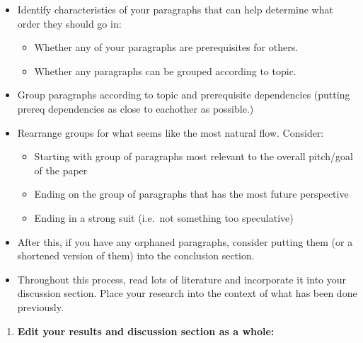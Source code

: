\documentclass[
]{krantz}
\providecommand{\tightlist}{%
  \setlength{\itemsep}{0pt}\setlength{\parskip}{0pt}}
\begin{document}
\begin{itemize}
\item
  Identify characteristics of your paragraphs that can help determine what order they should go in:

  \begin{itemize}
  \tightlist
  \item
    Whether any of your paragraphs are prerequisites for others.
  \item
    Whether any paragraphs can be grouped according to topic.
  \end{itemize}
\item
  Group paragraphs according to topic and prerequisite dependencies (putting prereq dependencies as close to eachother as possible.)
\item
  Rearrange groups for what seems like the most natural flow. Consider:

  \begin{itemize}
  \tightlist
  \item
    Starting with group of paragraphs most relevant to the overall pitch/goal of the paper
  \item
    Ending on the group of paragraphs that has the most future perspective
  \item
    Ending in a strong suit (i.e.~not something too speculative)
  \end{itemize}
\item
  After this, if you have any orphaned paragraphs, consider putting them (or a shortened version of them) into the conclusion section.
\item
  Throughout this process, read lots of literature and incorporate it into your discussion section. Place your research into the context of what has been done previously.
\end{itemize}

\begin{enumerate}
\def\labelenumi{\arabic{enumi}.}
\setcounter{enumi}{3}
\tightlist
\item
  \textbf{Edit your results and discussion section as a whole:}
\end{enumerate}
\end{document}

